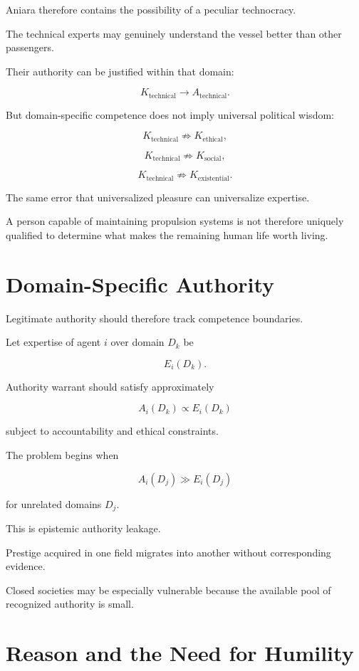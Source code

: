 \documentclass[11pt,oneside]{book}
\theoremstyle{definition}
\theoremstyle{remark}
\begin{document}
Aniara therefore contains the possibility of a peculiar technocracy.

The technical experts may genuinely understand the vessel better than other passengers.

Their authority can be justified within that domain:

\[
K_{\mathrm{technical}}
\rightarrow
A_{\mathrm{technical}}.
\]

But domain-specific competence does not imply universal political wisdom:

\[
K_{\mathrm{technical}}
\not\Rightarrow
K_{\mathrm{ethical}},
\]

\[
K_{\mathrm{technical}}
\not\Rightarrow
K_{\mathrm{social}},
\]

\[
K_{\mathrm{technical}}
\not\Rightarrow
K_{\mathrm{existential}}.
\]

The same error that universalized pleasure can universalize expertise.

A person capable of maintaining propulsion systems is not therefore uniquely qualified to determine what makes the remaining human life worth living.

\section{Domain-Specific Authority}

Legitimate authority should therefore track competence boundaries.

Let expertise of agent \(i\) over domain \(D_k\) be

\[
E_i(D_k).
\]

Authority warrant should satisfy approximately

\[
A_i(D_k)
\propto
E_i(D_k)
\]

subject to accountability and ethical constraints.

The problem begins when

\[
A_i(D_j)
\gg
E_i(D_j)
\]

for unrelated domains \(D_j\).

This is epistemic authority leakage.

Prestige acquired in one field migrates into another without corresponding evidence.

Closed societies may be especially vulnerable because the available pool of recognized authority is small.

\section{Reason and the Need for Humility}
\end{document}
